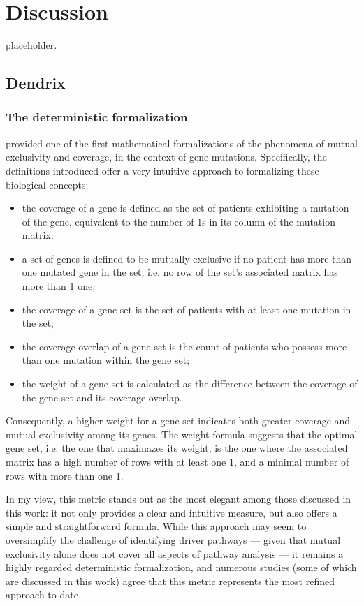 \chapter{Discussion} \label{chap:discussion}

placeholder. 

\section{Dendrix}

\subsection{The deterministic formalization}

\textcite{dendrix} provided one of the first mathematical formalizations of the phenomena of mutual exclusivity and coverage, in the context of gene mutations. Specifically, the definitions introduced offer a very intuitive approach to formalizing these biological concepts:

\begin{itemize}
    \item the coverage of a gene is defined as the set of patients exhibiting a mutation of the gene, equivalent to the number of 1s in its column of the mutation matrix;
    \item a set of genes is defined to be mutually exclusive if no patient has more than one mutated gene in the set, i.e. no row of the set's associated matrix has more than 1 one;
    \item the coverage of a gene set is the set of patients with at least one mutation in the set;
    \item the coverage overlap of a gene set is the count of patients who possess more than one mutation within the gene set;
    \item the weight of a gene set is calculated as the difference between the coverage of the gene set and its coverage overlap.
\end{itemize}

Consequently, a higher weight for a gene set indicates both greater coverage and mutual exclusivity among its genes. The weight formula suggests that the optimal gene set, i.e. the one that maximazes its weight, is the one where the associated matrix has a high number of rows with at least one 1, and a minimal number of rows with more than one 1.

In my view, this metric stands out as the most elegant among those discussed in this work: it not only provides a clear and intuitive measure, but also offers a simple and straightforward formula. While this approach may seem to oversimplify the challenge of identifying driver pathways --- given that mutual exclusivity alone does not cover all aspects of pathway analysis --- it remains a highly regarded deterministic formalization, and numerous studies (some of which are discussed in this work) agree that this metric represents the most refined approach to date.

